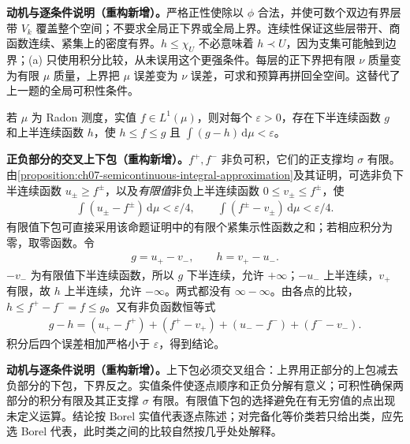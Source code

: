 \documentclass[../../main.tex]{subfiles}
\begin{document}
\begin{remark}
\textbf{动机与逐条件说明（重构新增）。}严格正性使除以 $\phi$ 合法，并使可数个双边有界层带 $V_k$ 覆盖整个空间；不要求全局正下界或全局上界。连续性保证这些层带开、商函数连续、紧集上的密度有界。$h\leqslant\chi_U$ 不必意味着 $h\prec U$，因为支集可能触到边界；(a) 只使用积分比较，从未误用这个更强条件。每层的正下界把有限 $\nu$ 质量变为有限 $\mu$ 质量，上界把 $\mu$ 误差变为 $\nu$ 误差，可求和预算再拼回全空间。这替代了上一题的全局可积性条件。
\end{remark}

\begin{exercise}\label{exercise:ch07-real-lone-semicontinuous}
若 $\mu$ 为 Radon 测度，实值 $f\in L^1(\mu)$，则对每个 $\varepsilon>0$，存在下半连续函数 $g$ 和上半连续函数 $h$，使 $h\leqslant f\leqslant g$ 且 $\int(g-h)\,\mathrm d\mu<\varepsilon$。
\end{exercise}
\begin{solution}
\textbf{正负部分的交叉上下包（重构新增）。}$f^+,f^-$ 非负可积，它们的正支撑均 $\sigma$ 有限。由\cref{proposition:ch07-semicontinuous-integral-approximation}及其证明，可选非负下半连续函数 $u_\pm\geqslant f^\pm$，以及\emph{有限值}非负上半连续函数 $0\leqslant v_\pm\leqslant f^\pm$，使
\begin{align*}
\int(u_\pm-f^\pm)\,\mathrm d\mu<\varepsilon/4,\qquad
\int(f^\pm-v_\pm)\,\mathrm d\mu<\varepsilon/4.
\end{align*}
有限值下包可直接采用该命题证明中的有限个紧集示性函数之和；若相应积分为零，取零函数。令
\begin{align*}
g=u_+-v_-,\qquad h=v_+-u_-.
\end{align*}
$-v_-$ 为有限值下半连续函数，所以 $g$ 下半连续，允许 $+\infty$；$-u_-$ 上半连续，$v_+$ 有限，故 $h$ 上半连续，允许 $-\infty$。两式都没有 $\infty-\infty$。由各点的比较，$h\leqslant f^+-f^-=f\leqslant g$。又有非负函数恒等式
\begin{align*}
g-h=(u_+-f^+)+(f^+-v_+)+(u_--f^-)+(f^--v_-).
\end{align*}
积分后四个误差相加严格小于 $\varepsilon$，得到结论。
\end{solution}
\begin{remark}
\textbf{动机与逐条件说明（重构新增）。}上下包必须交叉组合：上界用正部分的上包减去负部分的下包，下界反之。实值条件使逐点顺序和正负分解有意义；可积性确保两部分的积分有限及其正支撑 $\sigma$ 有限。有限值下包的选择避免在有无穷值的点出现未定义运算。结论按 Borel 实值代表逐点陈述；对完备化等价类若只给出类，应先选 Borel 代表，此时类之间的比较自然按几乎处处解释。
\end{remark}
\end{document}
